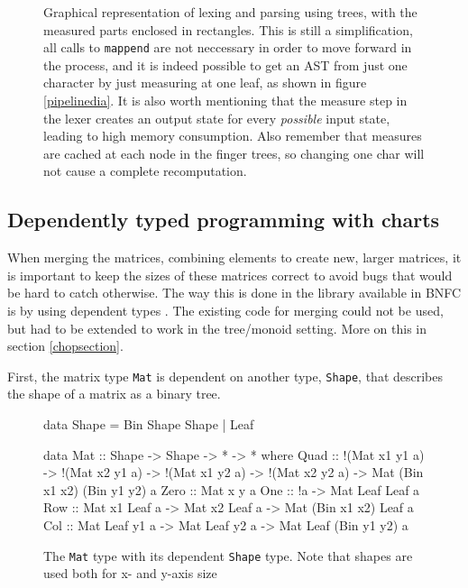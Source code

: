 \documentclass[a4paper,12pt,twosided]{report}
\renewcommand\cite{\citep}
\begin{document}
\begin{figure}[H]
\begin{tikzpicture}
    \end{tikzpicture}
\caption{\label{treemeasure}Graphical representation of lexing and parsing using
trees, with the measured parts enclosed in rectangles. This is still a
simplification, all calls to \texttt{mappend} are not neccessary in order to
move forward in the process, and it is indeed possible to get an AST from just
one character by just measuring at one leaf, as shown in figure
\ref{pipelinedia}. It is also worth mentioning that the measure step in the
lexer creates an output state for every \textit{possible} input state, leading
to high memory consumption. Also remember that measures are cached at each node
in the finger trees, so changing one char will not cause a complete
recomputation.}
\end{figure}

\subsection{Dependently typed programming with charts}
When merging the matrices, combining elements to create new, larger matrices, it
is important to keep the sizes of these matrices correct to avoid bugs that
would be hard to catch otherwise. The way this is done in the library available
in BNFC is by using dependent types \cite{jyp-bnfc}. The existing code for
merging could not be used, but had to be extended to work in the tree/monoid
setting. More on this in section \ref{chopsection}.

First, the matrix type \texttt{Mat} is dependent on another type,
\texttt{Shape}, that describes the shape of a matrix as a binary tree.

\begin{figure}[H]
\begin{code}
data Shape = Bin Shape Shape | Leaf

data Mat :: Shape -> Shape -> * -> * where
  Quad :: !(Mat x1 y1 a) -> !(Mat x2 y1 a) ->
          !(Mat x1 y2 a) -> !(Mat x2 y2 a) ->
          Mat (Bin x1 x2) (Bin y1 y2) a
  Zero :: Mat x y a
  One :: !a -> Mat Leaf Leaf a
  Row :: Mat x1 Leaf a -> Mat x2 Leaf a -> Mat (Bin x1 x2) Leaf a
  Col :: Mat Leaf y1 a -> Mat Leaf y2 a -> Mat Leaf (Bin y1 y2) a
\end{code}
\caption{\label{mat}The \texttt{Mat} type with its dependent \texttt{Shape}
type. Note that shapes are used both for x- and y-axis size}
\end{figure}
\end{document}
